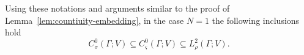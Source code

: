 \documentclass[final,onefignum,onetabnum]{mousaviart}
\begin{document}
		Using these notations and arguments similar to the proof of Lemma~\ref{lem:countiuity-embedding}, in the case $N=1$ the following inclusions hold
		\begin{equation}
			\label{subset:inclusions}
			C^0_\sigma\left( \Gamma; V \right)
			\subseteq
			C^0_\varsigma\left( \Gamma; V \right)
			\subseteq
			L^2_\rho \left( \Gamma; V \right) .
		\end{equation}	
\end{document}
